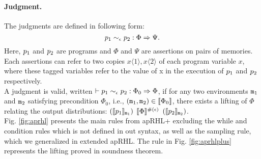 \documentclass[a4paper,11pt]{article}
\begin{document}
\paragraph{Judgment.}
The judgments are defined in following form:
\[
	p_1 \sim_{\epsilon} p_2: \Phi \Rightarrow \Psi.
\]
Here, $p_1$ and $p_2$ are programs and $\Phi$ and $\Psi$ are assertions on pairs of memories. Each assertions can refer to two copies $x\langle 1 \rangle, x\langle 2 \rangle$ of each program variable $x$, where these tagged variables refer to the value of x in the execution of $p_1$ and $p_2$ respectively.
%
\\
A judgment is valid, written $\vdash p_1 \sim_{\epsilon} p_2: \Phi_0 \Rightarrow \Phi$, 
if for any two environments $\mathtt{m}_1$ and $\mathtt{m}_2$ satisfying precondition $\Phi_0$, 
i.e., $(\mathtt{m}_1, \mathtt{m}_2) \in \llbracket \Phi_0 \rrbracket$, there exists a lifting of $\Phi$ relating the output distributions: 
%
$(\llbracket p_1 \rrbracket_{\mathtt{m}_1})$ 
$\llbracket \Phi \rrbracket^{\#(\epsilon)}$ 
$(\llbracket p_2 \rrbracket_{\mathtt{m}_2})$.
%
\\
%
Fig. \ref{fig:aprhl} presents the main rules from apRHL+ \cite{barthe2016proving} excluding the while and condition rules which is not defined in out syntax, as well as the sampling rule, which we generalized in extended apRHL.
The rule in Fig. \ref{fig:aprhlplus} represents the lifting proved in soundness theorem.
%
\end{document}
